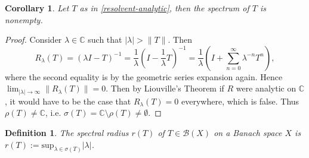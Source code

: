 \documentclass[12pt,oneside]{report}
\newtheorem{cor}[thm]{Corollary}
\newtheorem{defn}[thm]{Definition}
\begin{document}
\begin{cor}\label{spectrum-nonempty}
    Let $T$ as in \ref{resolvent-analytic}, then the spectrum of $T$ is nonempty.
\end{cor}
\begin{proof}
    Consider $\lambda \in \mathbb{C}$ such that $|\lambda| > \|T\|$. Then $$R_{\lambda}(T) = (\lambda I - T)^{-1} = \frac{1}{\lambda}\left( I - \frac{1}{\lambda}T \right)^{-1} = \frac{1}{\lambda}\left( I + \sum_{n=0}^{\infty} \lambda^{-n} T^{n} \right),$$ where the second equality is by the geometric series expansion again. Hence $\lim_{ |\lambda| \to \infty } \|R_{\lambda}(T)\| = 0$. Then by Liouville's Theorem if $R$ were analytic on $\mathbb{C}$, it would have to be the case that $R_{\lambda}(T) = 0$ everywhere, which is false. Thus $\rho(T) \neq \mathbb{C}$, i.e. $\sigma(T) = \mathbb{C} \setminus \rho(T) \neq \emptyset$.
\end{proof}

\begin{defn}
    The spectral radius $r(T)$ of $T \in \mathscr{B}(X)$ on a Banach space $X$ is $r(T) := \text{sup}_{\lambda \in \sigma(T)} |\lambda|$.
\end{defn}
\end{document}
